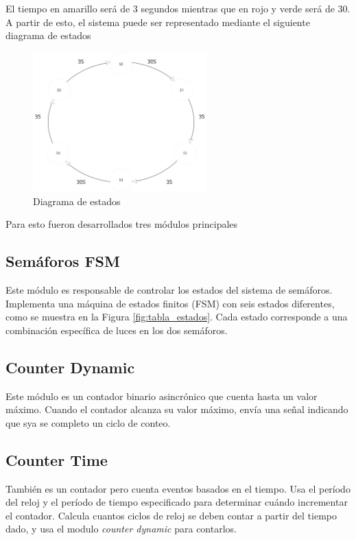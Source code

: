 \documentclass[titlepage,a4paper]{article}
\begin{document}
El tiempo en amarillo será de 3 segundos mientras que en rojo y verde será de 30. A partir de esto, el sistema puede ser representado mediante el siguiente diagrama de estados

\begin{figure}[H]
\centering
\includegraphics[width=0.6\textwidth]{figures/diagrama_estados.jpg}
\caption{\label{fig:diagrama_estados}Diagrama de estados}
\end{figure}

Para esto fueron desarrollados tres módulos principales

\subsection{Semáforos FSM}

Este módulo es responsable de controlar los estados del sistema de semáforos. Implementa una máquina de estados finitos (FSM) con seis estados diferentes, como se muestra en la Figura \ref{fig:tabla_estados}. Cada estado corresponde a una combinación específica de luces en los dos semáforos.

\subsection{Counter Dynamic}

Este módulo es un contador binario asincrónico que cuenta hasta un valor máximo. Cuando el contador alcanza su valor máximo, envía una señal indicando que sya se completo un ciclo de conteo.

\subsection{Counter Time}

También es un contador pero cuenta eventos basados en el tiempo. Usa el período del reloj y el período de tiempo especificado para determinar cuándo incrementar el contador. Calcula cuantos ciclos de reloj se deben contar a partir del tiempo dado, y usa el modulo \textit{counter dynamic} para contarlos. 
\end{document}
